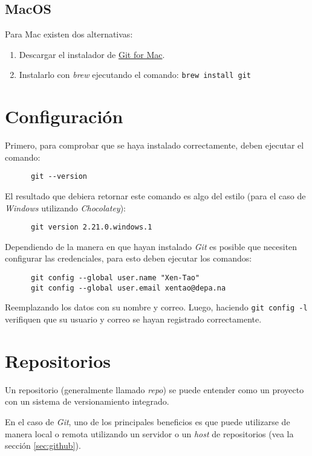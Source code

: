     \subsection{MacOS}
      Para Mac existen dos alternativas:
      \begin{enumerate}
        \item Descargar el instalador de 
          \href{https://sourceforge.net/projects/git-osx-installer/files/}{Git for Mac}.
        \item Instalarlo con \textit{brew} ejecutando el comando: 
          \texttt{brew install git}
      \end{enumerate}

  \section{Configuración}
    Primero, para comprobar que se haya instalado correctamente, deben ejecutar el comando:
    \begin{verbatim}
      git --version
    \end{verbatim}
    El resultado que debiera retornar este comando es algo del estilo (para el caso de 
    \textit{Windows} utilizando \textit{Chocolatey}):
    \begin{verbatim}
      git version 2.21.0.windows.1
    \end{verbatim}

    Dependiendo de la manera en que hayan instalado \textit{Git} es posible que 
    necesiten configurar las credenciales, para esto deben ejecutar los comandos:
    \begin{verbatim}
      git config --global user.name "Xen-Tao"
      git config --global user.email xentao@depa.na
    \end{verbatim}

    Reemplazando los datos con su nombre y correo.
    Luego, haciendo \texttt{git config -l} verifiquen que su usuario y correo se
    hayan registrado correctamente.

  \section{Repositorios}
    Un repositorio (generalmente llamado \textit{repo}) se puede entender como un proyecto
    con un sistema de versionamiento integrado.

    En el caso de \textit{Git}, uno de los principales beneficios es que puede utilizarse
    de manera local o remota utilizando un servidor o un \textit{host} de repositorios 
    (vea la sección \ref{sec:github}).

